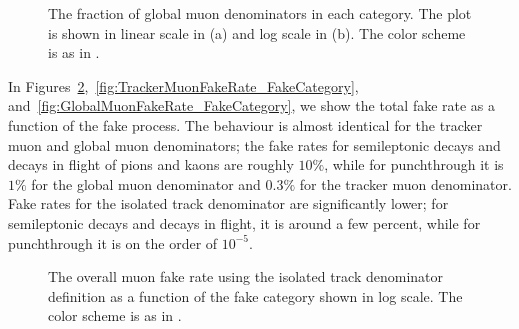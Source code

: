 \documentclass{cmspaper}
\begin{document}
\begin{figure}[htb]
\begin{center}
   \caption{The fraction of global muon denominators in each category. The plot is shown in linear scale in (a) and log scale in (b). The color scheme is as in .}
   \label{fig:GlobalMuonDenominatorFakeCategory}
\end{center}
\end{figure}

\clearpage

In Figures~\ref{fig:IsoTrackMuonFakeRate_FakeCategory},~\ref{fig:TrackerMuonFakeRate_FakeCategory}, and~\ref{fig:GlobalMuonFakeRate_FakeCategory}, we show the total fake rate as a function of the fake process. The behaviour is almost identical for the tracker muon and global muon denominators; the fake rates for semileptonic decays and decays in flight of pions and kaons are roughly $10\%$, while for punchthrough it is $1\%$ for the global muon denominator and $0.3\%$ for the tracker muon denominator. Fake rates for the isolated track denominator are significantly lower; for semileptonic decays and decays in flight, it is around a few percent, while for punchthrough it is on the order of $10^{-5}$.

\begin{figure}[htb]
\begin{center}    
   \caption{The overall muon fake rate using the isolated track denominator definition as a function of the fake category shown in log scale. The color scheme is as in .}
   \label{fig:IsoTrackMuonFakeRate_FakeCategory}
\end{center}
\end{figure}
\end{document}
